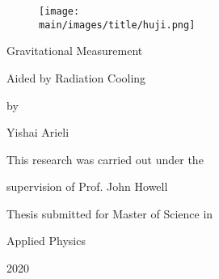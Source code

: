 \documentclass[\main/master.tex]{subfiles}
\begin{document}
\pagestyle{empty}
\begin{titlepage}
\begin{figure}[htbp]
	\centering
	\texttt{[image: \\main/images/title/huji.png]}
\end{figure}
\doublespacing
\begin{center}
  {\titlefont Gravitational Measurement \par \vspace{10 mm}
   Aided by Radiation Cooling
   }
   \vspace{1in}
   
   by\par
   
   Yishai Arieli\par
   This research was carried out under the\par
   supervision of Prof. John Howell\par
   \vspace{1.5in}
   
   Thesis submitted for Master of Science in\par
   Applied Physics\par
   2020
   \end{center}
  \end{titlepage}
\end{document}
